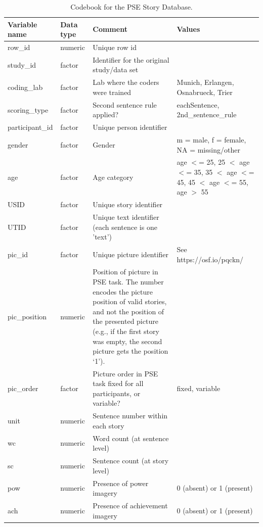 \documentclass[jou,a4paper]{apa6}\usepackage[]{graphicx}\usepackage[]{color}
\begin{document}
\begin{table}
\begin{threeparttable}
		\caption{Codebook for the PSE Story Database.}
		\label{tab:codebook}
		\footnotesize
		\begin{tabularx}{\textwidth}{llXX}
		\toprule
Variable name & Data type & Comment & Values \\ 
  \hline
row\_id & numeric & Unique row id &  \\ 
  study\_id & factor & Identifier for the original study/data set &  \\ 
  coding\_lab & factor & Lab where the coders were trained & Munich, Erlangen, Osnabrueck, Trier \\ 
  scoring\_type & factor & Second sentence rule applied? & eachSentence, 2nd\_sentence\_rule \\ 
  participant\_id & factor & Unique person identifier &  \\ 
  gender & factor & Gender & m = male, f = female, NA = missing/other \\ 
  age & factor & Age category & age $<$= 25, 25 $<$ age $<$= 35, 35 $<$ age $<$= 45, 45 $<$ age $<$= 55, age $>$ 55 \\ 
  USID & factor & Unique story identifier &  \\ 
  UTID & factor & Unique text identifier (each sentence is one 'text') &  \\ 
  pic\_id & factor & Unique picture identifier & See https://osf.io/pqckn/ \\ 
  pic\_position & numeric & Position of picture in PSE task. The number encodes the picture position of valid stories, and not the position of the presented picture (e.g., if the first story was empty, the second picture gets the position `1'). &  \\ 
  pic\_order & factor & Picture order in PSE task fixed for all participants, or variable? & fixed, variable \\ 
  unit & numeric & Sentence number within each story &  \\ 
  wc & numeric & Word count (at sentence level) &  \\ 
  sc & numeric & Sentence count (at story level) &  \\ 
  pow & numeric & Presence of power imagery & 0 (absent) or 1 (present) \\ 
  ach & numeric & Presence of achievement imagery & 0 (absent) or 1 (present) \\ 

\end{tabularx}
\end{threeparttable}
\end{table}
\end{document}

